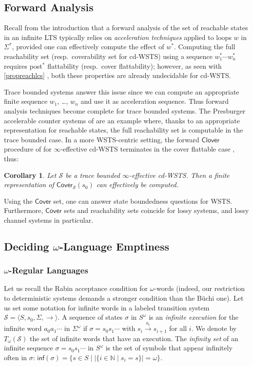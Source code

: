 \documentclass[11pt,reqno,a4paper]{amsart}
\newcommand{\tup}[1]{\langle #1\rangle}
\newcommand{\ru}[1]{\xrightarrow{#1}}
\theoremstyle{plain}
\newtheorem{corollary}[theorem]{Corollary}
\theoremstyle{definition}
\theoremstyle{remark}
\renewcommand{\paragraph}{\subsubsection*}
\begin{document}
\subsection{Forward Analysis}\label{sub:cover}
Recall from the introduction that a forward analysis of the set
of reachable states in an infinite LTS typically relies on
\emph{acceleration techniques} \citep[see e.g.][]{flataccel}
applied to loops $w$ in $\Sigma^\ast$, provided one can effectively
compute the effect of $w^\ast$.  Computing the full reachability set
(resp.\ coverability set for cd-WSTS) using a sequence $w_1^\ast\cdots
w_n^\ast$ requires post$^\ast$ flattability (resp.\ cover
flattability); however, as seen with \autoref{propreachlcs}
\citep[resp.][Proposition~6]{cwsts2}, both these properties are
already undecidable for cd-WSTS.

Trace bounded systems answer this issue since we can compute an
appropriate finite sequence $w_1$, \dots, $w_n$ and use it as
acceleration sequence.  Thus forward analysis techniques become
complete for trace bounded systems.  The Presburger accelerable counter
systems of \citet{foctlpr} are an example where, thanks to an
appropriate representation for reachable states, the full reachability
set is computable in the trace bounded case.
In a more WSTS-centric setting, the forward $\mathsf{Clover}$ procedure of
\citeauthor{cwsts2} for $\infty$-effective cd-WSTS terminates in the
cover flattable case \citep[Theorem~3]{cwsts2}, thus:
\begin{corollary}\label{cor:cover}
  Let $\mathcal{S}$ be a trace bounded $\infty$-effective cd-WSTS.  Then a
  finite representation of $\mathsf{Cover}_\mathcal{S}(s_0)$ can effectively
  be computed.
\end{corollary}
\noindent Using the $\mathsf{Cover}$ set, one can
answer state boundedness questions for WSTS.  Furthermore,
$\mathsf{Cover}$ sets and reachability sets coincide for lossy systems,
and lossy channel systems in particular.


\subsection{Deciding $\omega$-Language Emptiness}\label{sub:declive}
\paragraph{$\omega$-Regular Languages}
Let us recall the Rabin acceptance condition for $\omega$-words
(indeed, our restriction to deterministic systems demands a stronger
condition than the B\"uchi one).
Let us set some notation for infinite words in a labeled
transition system \mbox{$\mathcal{S}=\tup{S,s_0,\Sigma,\rightarrow}$}.  A
sequence of states $\sigma$ in $S^\omega$ is an \emph{infinite
  execution} for the infinite word $a_0a_1\cdots$ in $\Sigma^\omega$ if
$\sigma=s_0s_1\cdots$ with $s_i\ru{a_i} s_{i+1}$ for all $i$.   We
denote by $T_\omega(\mathcal{S})$ the set of infinite words that have
an execution.  The \emph{infinity set} of an infinite sequence
$\sigma=s_0s_1\cdots$ in $S^\omega$ is the set of
symbols that appear infinitely often in $\sigma$:
$\mathsf{inf}(\sigma)=\{s\in S\mid|\{i\in\mathbb{N}\mid
s_i=s\}|=\omega\}$.
\end{document}
